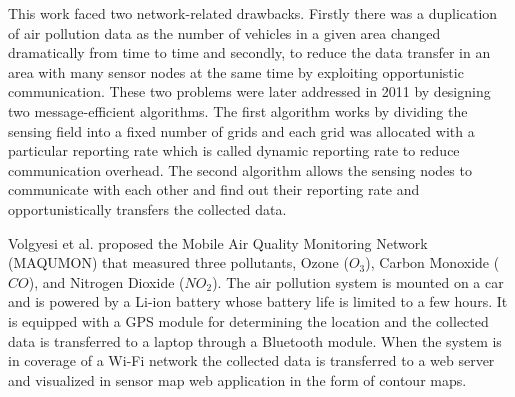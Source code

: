  This work faced two network-related drawbacks. Firstly there was a duplication of air pollution data as the number of vehicles in a given area changed dramatically from time to time and secondly, to reduce the data transfer in an area with many sensor nodes at the same time by exploiting opportunistic communication. These two problems were later addressed in 2011 \cite{Hu2011} by designing two message-efficient algorithms. The first algorithm works by dividing the sensing field into a fixed number of grids and each grid was allocated with a particular reporting rate which is called dynamic reporting rate to reduce communication overhead. The second algorithm allows the sensing nodes to communicate with each other and find out their reporting rate and opportunistically transfers the collected data. %



\par

 Volgyesi et al. \cite{Volgyesi2008} proposed the Mobile Air Quality Monitoring Network (MAQUMON) that measured three pollutants, Ozone ($O_3$), Carbon Monoxide ($CO$), and Nitrogen Dioxide ($NO_2$). The air pollution system is mounted on a car and is powered by a Li-ion battery whose battery life is limited to a few hours. It is equipped with a GPS module for determining the location and the collected data is transferred to a laptop through a Bluetooth module. When the system is in coverage of a Wi-Fi network the collected data is transferred to a web server and visualized in sensor map web application in the form of contour maps. %


\par


